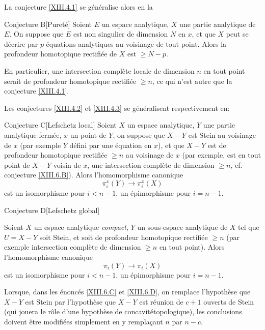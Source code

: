 La conjecture \ref{XIII.4.1} se g\'en\'eralise alors en la

 \label{XIII.6.B}
\begin{enonce*}{Conjecture B}[\og Puret\'e{\fg}\ndemark]
Soient $E$ un espace analytique, $X$ une partie analytique de $E$. On suppose que $E$ est non singulier de dimension $N$ en $x$, et que $X$ peut se d\'ecrire par $p$ \'equations analytiques au voisinage de tout point. Alors la profondeur homotopique rectifi\'ee de $X$ est $\geq N-p$.
\end{enonce*}

En particulier, une intersection compl\`ete locale de dimension $n$ en tout point serait de profondeur homotopique rectifi\'ee $\geq n$, ce qui n'est autre que la conjecture \ref{XIII.4.1}.

Les conjectures \ref{XIII.4.2} et \ref{XIII.4.3} se g\'en\'eralisent respectivement en:

 \label{XIII.6.C}
\begin{enonce*}{Conjecture C}[\og Lefschetz local{\fg}\ndemark]
Soient $X$ un espace analytique, $Y$ une partie analytique ferm\'ee, $x$ un point de $Y$, on suppose que $X-Y$ est Stein au voisinage de $x$ (par exemple $Y$ d\'efini par une \'equation en $x$), et que $X-Y$ est de profondeur homotopique rectifi\'ee $\geq n$ au voisinage de $x$ (par exemple, est en tout point de $X-Y$ voisin de $x$, une intersection compl\`ete de dimension $\geq n$, cf. conjecture \ref{XIII.6.B}). Alors l'homomorphisme canonique
$$
\pi_i^x(Y)\to\pi_i^x(X)$$
est un isomorphisme pour $i<n-1$, un \'epimorphisme pour $i=n-1$.
\end{enonce*}

 \label{XIII.6.D}
\begin{enonce*}{Conjecture D}[\og Lefschetz global{\fg}\ndemark]

Soient $X$ un espace analytique \emph{compact}, $Y$ un sous-espace analytique de $X$ tel que $U=X-Y$ soit Stein, et soit de profondeur homotopique rectifi\'ee $\geq n$ (par exemple intersection compl\`ete de dimension $\geq n$ en tout point). Alors l'homomorphisme canonique
$$
\pi_i(Y)\to\pi_i(X)$$
est un isomorphisme pour $i<n-1$, un \'epimorphisme pour $i=n-1$.
\end{enonce*}

\begin{remarquestar}
Lorsque, dans les \'enonc\'es \ref{XIII.6.C} et \ref{XIII.6.D}, on
remplace l'hypoth\`ese que $X-Y$ est Stein par l'hypoth\`ese que
$X-Y$ est r\'eunion de $c+1$ ouverts de Stein (qui jouera le
r\^{o}le d'une hypoth\`ese de \og concavit\'e\fg topologique), les
conclusions doivent \^etre modifi\'ees simplement en y rempla\c cant
$n$ par $n-c$.
\end{remarquestar}

